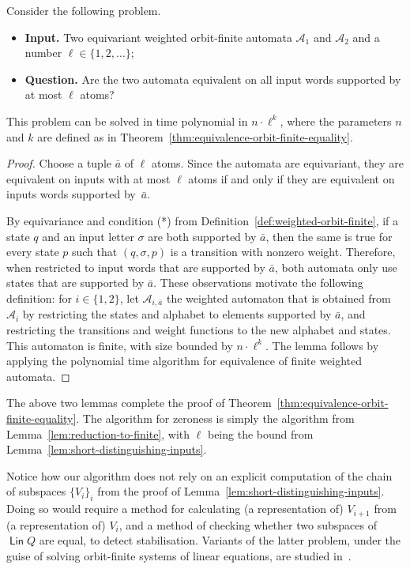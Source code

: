 \documentclass{theoretics}
\newcommand{\set}[1]{\{#1\}}
\newcommand{\Aa}{{\mathcal A}}
\DeclareMathOperator{\lin}{\mathsf{Lin}}
\begin{document}
\begin{lemma}\label{lem:reduction-to-finite}
    Consider the following problem. 
\begin{itemize}
\item {\bf Input.} Two equivariant weighted orbit-finite automata $\Aa_1$ and $\Aa_2$ and a number $\ell \in \set{1,2,\ldots}$;
\item {\bf Question.} Are the two  automata equivalent on all input words supported by at most $\ell$ atoms?
\end{itemize}
This problem can be solved  in time polynomial in $n  \cdot \ell^k$, where the parameters $n$ and $k$ are defined as in Theorem~\ref{thm:equivalence-orbit-finite-equality}.
    \end{lemma}
\begin{proof}
    Choose a tuple $\bar a$ of $\ell$ atoms. Since the automata are equivariant, they are equivalent on inputs with at most $\ell$ atoms if and only if they are equivalent on inputs words supported by~$\bar a$. 

    By equivariance and condition (*) from Definition~\ref{def:weighted-orbit-finite}, if a state $q$  and an input letter $\sigma$ are both supported by $\bar a$, then the same is true for every state $p$ such that $(q,\sigma,p)$ is a transition with nonzero weight.  Therefore, when restricted to input words that are supported by $\bar a$, both automata only use states that are supported by $\bar a$.  These observations motivate the  following definition: for $i \in \set{1,2}$,   let  $\Aa_{i, \bar a}$ the  weighted automaton that is obtained from $\Aa_i$ by restricting  the states and alphabet to elements supported by $\bar a$, and restricting the transitions and weight functions to the new alphabet and states. 
    This automaton is finite, 
with size  bounded by $n \cdot \ell^k$. The lemma follows by applying the polynomial time algorithm for equivalence of finite weighted automata. 
\end{proof}

The above two lemmas complete the proof of Theorem~\ref{thm:equivalence-orbit-finite-equality}. The algorithm for zeroness is simply the algorithm from Lemma~\ref{lem:reduction-to-finite}, with $\ell$ being the bound  from Lemma~\ref{lem:short-distinguishing-inputs}.

Notice how our algorithm does not rely on an explicit computation of the chain of subspaces $\{V_i\}_i$ from the proof of Lemma~\ref{lem:short-distinguishing-inputs}. Doing so would require a method for calculating (a representation of) $V_{i+1}$ from (a representation of) $V_i$, and a method of checking whether two subspaces of $\lin Q$ are equal, to detect stabilisation. Variants of the latter problem, under the guise of solving orbit-finite systems of linear equations, are studied in~\cite{GHL22}.
\end{document}
